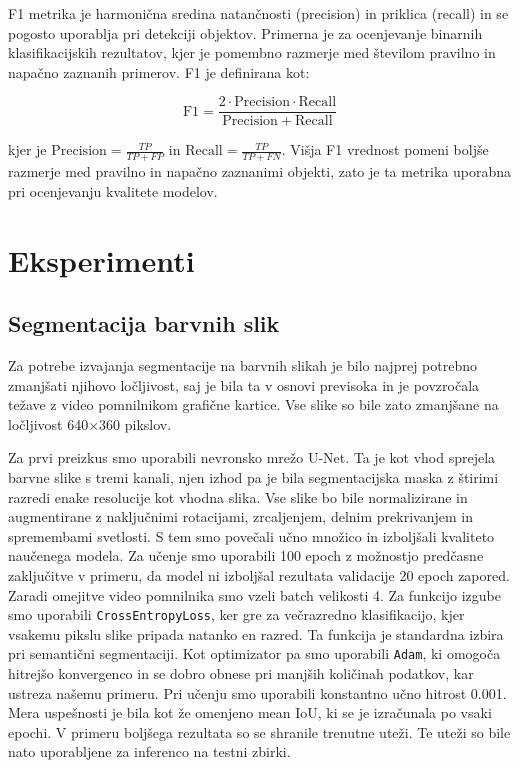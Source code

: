 \documentclass[10pt,twocolumn,letterpaper]{article}
\begin{document}
F1 metrika je harmonična sredina natančnosti (precision) in priklica (recall) in se pogosto uporablja pri detekciji objektov. Primerna je za ocenjevanje binarnih klasifikacijskih rezultatov, kjer je pomembno razmerje med številom pravilno in napačno zaznanih primerov.
F1 je definirana kot:

\begin{equation}
\mathrm{F1} = \frac{2 \cdot \mathrm{Precision} \cdot \mathrm{Recall}}{\mathrm{Precision} + \mathrm{Recall}}
\end{equation}

kjer je $\mathrm{Precision} = \frac{TP}{TP + FP}$ in $\mathrm{Recall} = \frac{TP}{TP + FN}$. Višja F1 vrednost pomeni boljše razmerje med pravilno in napačno zaznanimi objekti, zato je ta metrika uporabna pri ocenjevanju kvalitete modelov.


\section{Eksperimenti}
\subsection{Segmentacija barvnih slik}
Za potrebe izvajanja segmentacije na barvnih slikah je bilo najprej potrebno zmanjšati njihovo ločljivost, saj je bila ta v osnovi previsoka in je povzročala težave z video pomnilnikom grafične kartice. Vse slike so bile zato zmanjšane na ločljivost 640×360 pikslov.

Za prvi preizkus smo uporabili nevronsko mrežo U-Net. Ta je kot vhod sprejela barvne slike s tremi kanali, njen izhod pa je bila segmentacijska maska z štirimi razredi enake resolucije kot vhodna slika. Vse slike bo bile normalizirane in augmentirane z naključnimi rotacijami, zrcaljenjem, delnim prekrivanjem in spremembami svetlosti. S tem smo povečali učno množico in izboljšali kvaliteto naučenega modela. 
Za učenje smo uporabili 100 epoch z možnostjo predčasne zaključitve v primeru, da model ni izboljšal rezultata validacije 20 epoch zapored. Zaradi omejitve video pomnilnika smo vzeli batch velikosti 4. Za funkcijo izgube smo uporabili \texttt{CrossEntropyLoss}, ker gre za večrazredno klasifikacijo, kjer vsakemu pikslu slike pripada natanko en razred. Ta funkcija je standardna izbira pri semantični segmentaciji. Kot optimizator pa smo uporabili \texttt{Adam}, ki omogoča hitrejšo konvergenco in se dobro obnese pri manjših količinah podatkov, kar ustreza našemu primeru. Pri učenju smo uporabili konstantno učno hitrost 0.001. 
Mera uspešnosti je bila kot že omenjeno mean IoU, ki se je izračunala po vsaki epochi. V primeru boljšega rezultata so se shranile trenutne uteži. Te uteži so bile nato uporabljene za inferenco na testni zbirki.
\end{document}
